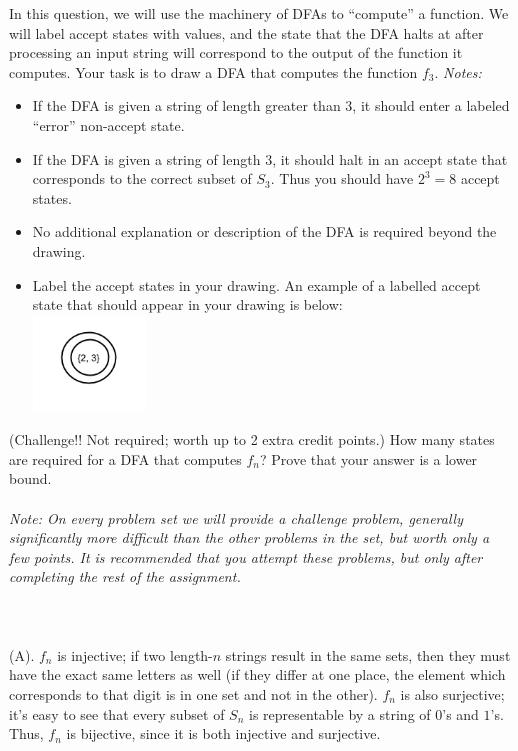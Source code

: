 \documentclass[solution, letterpaper]{cs121}
\begin{document}
\subproblem In this question, we will use the machinery of DFAs to ``compute'' a function. We will label accept states with values, and the state that the DFA halts at after processing an input string will correspond to the output of the function it computes. Your task is to draw a DFA that computes the function $f_3$. \textit{Notes: } 
\begin{itemize}
\item If the DFA is given a string of length greater than 3, it should enter a labeled ``error'' non-accept state. 
\item If the DFA is given a string of length 3, it should halt in an accept state that corresponds to the correct subset of $S_3$.  Thus you should have $2^3 = 8$ accept states. 
\item No additional explanation or description of the DFA is required beyond the drawing. 
\item Label the accept states in your drawing. An example of a labelled accept state that should appear in your drawing is below:\\
\includegraphics[width=3cm]{1-1ex.png}
\end{itemize}
\subproblem (Challenge!! Not required; worth up to 2 extra credit points.) How many states are required for a DFA that computes $f_n$? Prove that your answer is a lower bound.\\\\
\textit{Note: On every problem set we will provide a challenge problem, generally significantly more difficult than the other problems in the set, but worth only a few points. It is recommended that you attempt these problems, but only after completing the rest of the assignment.} 
\\\\
\\\\(A). $f_n$ is injective; if two length-$n$ strings result in the same sets, then they must have the exact same letters as well (if they differ at one place, the element which corresponds to that digit is in one set and not in the other).  $f_n$ is also surjective; it's easy to see that every subset of $S_n$ is representable by a string of $0$'s and $1$'s.  Thus, $f_n$ is bijective, since it is both injective and surjective.
\end{document}
